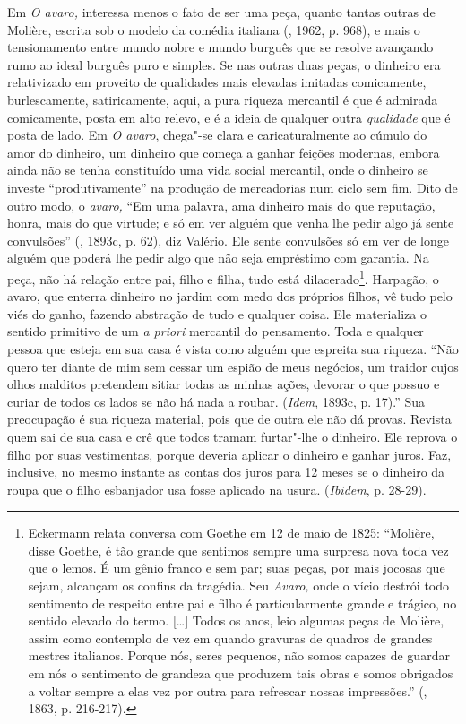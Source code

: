 Em \emph{O avaro,} interessa menos o fato de ser uma peça, quanto tantas
outras de Molière, escrita sob o modelo da comédia italiana (, 1962,
p. 968), e mais o tensionamento entre mundo nobre e mundo burguês que se
resolve avançando rumo ao ideal burguês puro e simples. Se nas outras
duas peças, o dinheiro era relativizado em proveito de qualidades mais
elevadas imitadas comicamente, burlescamente, satiricamente, aqui, a
pura riqueza mercantil é que é admirada comicamente, posta em alto
relevo, e é a ideia de qualquer outra \emph{qualidade} que é posta de
lado. Em \emph{O avaro}, chega"-se clara e caricaturalmente ao cúmulo do
amor do dinheiro, um dinheiro que começa a ganhar feições modernas,
embora ainda não se tenha constituído uma vida social mercantil, onde o
dinheiro se investe ``produtivamente'' na produção de mercadorias num
ciclo sem fim. Dito de outro modo, o \emph{avaro,} ``Em uma palavra, ama
dinheiro mais do que reputação, honra, mais do que virtude; e só em ver
alguém que venha lhe pedir algo já sente convulsões'' (, 1893c,
p. 62), diz Valério. Ele sente convulsões só em ver de longe alguém que
poderá lhe pedir algo que não seja empréstimo com garantia. Na peça, não
há relação entre pai, filho e filha, tudo está dilacerado\footnote{Eckermann
  relata conversa com Goethe em 12 de maio de 1825: ``Molière, disse
  Goethe, é tão grande que sentimos sempre uma surpresa nova toda vez
  que o lemos. É um gênio franco e sem par; suas peças, por mais jocosas
  que sejam, alcançam os confins da tragédia. Seu \emph{Avaro,} onde o
  vício destrói todo sentimento de respeito entre pai e filho é
  particularmente grande e trágico, no sentido elevado do termo.
  [\ldots{}] Todos os anos, leio algumas peças de Molière, assim como
  contemplo de vez em quando gravuras de quadros de grandes mestres
  italianos. Porque nós, seres pequenos, não somos capazes de guardar em
  nós o sentimento de grandeza que produzem tais obras e somos obrigados
  a voltar sempre a elas vez por outra para refrescar nossas
  impressões.'' (, 1863, p. 216-217).}. Harpagão, o avaro, que
enterra dinheiro no jardim com medo dos próprios filhos, vê tudo pelo
viés do ganho, fazendo abstração de tudo e qualquer coisa. Ele
materializa o sentido primitivo de um \emph{a priori} mercantil do
pensamento. Toda e qualquer pessoa que esteja em sua casa é vista como
alguém que espreita sua riqueza. ``Não quero ter diante de mim sem
cessar um espião de meus negócios, um traidor cujos olhos malditos
pretendem sitiar todas as minhas ações, devorar o que possuo e curiar de
todos os lados se não há nada a roubar. (\emph{Idem}, 1893c, p. 17).''
Sua preocupação é sua riqueza material, pois que de outra ele não dá
provas. Revista quem sai de sua casa e crê que todos tramam furtar"-lhe o
dinheiro. Ele reprova o filho por suas vestimentas, porque deveria
aplicar o dinheiro e ganhar juros. Faz, inclusive, no mesmo instante as
contas dos juros para 12 meses se o dinheiro da roupa que o filho
esbanjador usa fosse aplicado na usura. (\emph{Ibidem}, p. 28-29).

